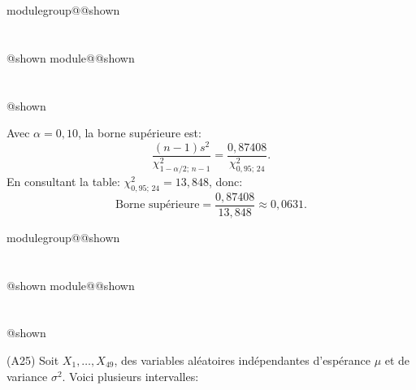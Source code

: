 \documentclass{Evaluation}
\makeatletter
\newcommand{\currentmodulekey}{}
\newcommand{\currentmoduletitle}{}
\newcommand{\currentgroupkey}{}
\newcommand{\currentgrouptitle}{}
\newcommand{\showmoduleifneeded}{%
  \ifx\currentgroupkey\empty\else
    \expandafter\ifx\csname modulegroup@\currentgroupkey @shown\endcsname\relax
      \section*{\currentgrouptitle}%
      \expandafter\gdef\csname modulegroup@\currentgroupkey @shown\endcsname{1}%
    \fi
  \fi
  \expandafter\ifx\csname module@\currentmodulekey @shown\endcsname\relax
    \section*{\currentmoduletitle}%
    \expandafter\gdef\csname module@\currentmodulekey @shown\endcsname{1}%
  \fi
}
\newenvironment{A24}{\showmoduleifneeded}{}
\newenvironment{A25}{\showmoduleifneeded}{}
\makeatother
\begin{document}
\begin{questions}
\begin{A24}
\begin{parts}
    \begin{solution}
    Avec $\alpha = 0{,}10$, la borne supérieure est:
    \[
    \frac{(n-1)s^2}{\chi^2_{1-\alpha/2;\,n-1}} = \frac{0{,}87408}{\chi^2_{0{,}95;\,24}}.
    \]
    En consultant la table: $\chi^2_{0{,}95;\,24} = 13{,}848$, donc:
    \[
    \text{Borne supérieure} = \frac{0{,}87408}{13{,}848} \approx 0{,}0631.
    \]
    \end{solution}

\end{parts}
\end{A24}



\begin{A25}
\question (A25) Soit $X_1,\hdots, X_{49}$, des variables aléatoires indépendantes d'espérance $\mu$ et de variance $\sigma^2$. Voici plusieurs intervalles:
\begin{center}
    

\end{center}
\end{A25}
\end{questions}
\end{document}
